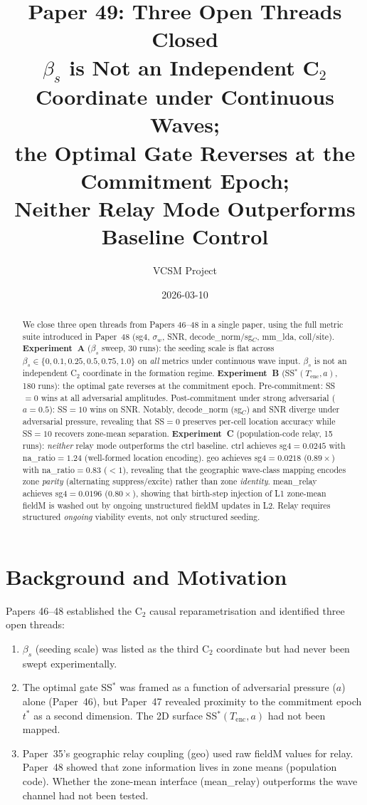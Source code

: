 \documentclass[11pt,a4paper]{article}
\title{\textbf{Paper 49: Three Open Threads Closed}\\
\large $\beta_s$ is Not an Independent C$_2$ Coordinate under Continuous Waves;\\
the Optimal Gate Reverses at the Commitment Epoch;\\
Neither Relay Mode Outperforms Baseline Control}
\author{VCSM Project}
\date{2026-03-10}
\begin{document}
\maketitle

\begin{abstract}
We close three open threads from Papers 46--48 in a single paper, using the full
metric suite introduced in Paper~48 (sg4, $\sigma_w$, SNR, decode\_norm/sg$_C$,
mm\_lda, coll/site).
\textbf{Experiment~A} ($\beta_s$ sweep, 30 runs): the seeding scale is flat across
$\beta_s \in \{0, 0.1, 0.25, 0.5, 0.75, 1.0\}$ on \emph{all} metrics under
continuous wave input.
$\beta_s$ is not an independent C$_2$ coordinate in the formation regime.
\textbf{Experiment~B} (SS$^*(T_\mathrm{enc}, a)$, 180 runs): the optimal gate
reverses at the commitment epoch.
Pre-commitment: SS$=0$ wins at all adversarial amplitudes.
Post-commitment under strong adversarial ($a=0.5$): SS$=10$ wins on SNR.
Notably, decode\_norm (sg$_C$) and SNR diverge under adversarial pressure,
revealing that SS$=0$ preserves per-cell location accuracy while SS$=10$ recovers
zone-mean separation.
\textbf{Experiment~C} (population-code relay, 15 runs): \emph{neither} relay mode
outperforms the ctrl baseline.
ctrl achieves sg4$=0.0245$ with na\_ratio$=1.24$ (well-formed location encoding).
geo achieves sg4$=0.0218$ ($0.89\times$) with na\_ratio$=0.83$ ($<1$),
revealing that the geographic wave-class mapping encodes zone
\emph{parity} (alternating suppress/excite) rather than zone \emph{identity}.
mean\_relay achieves sg4$=0.0196$ ($0.80\times$), showing that birth-step injection
of L1 zone-mean fieldM is washed out by ongoing unstructured fieldM updates in L2.
Relay requires structured \emph{ongoing} viability events, not only structured seeding.
\end{abstract}

\section{Background and Motivation}

Papers 46--48 established the C$_2$ causal reparametrisation and identified three
open threads:

\begin{enumerate}
  \item $\beta_s$ (seeding scale) was listed as the third C$_2$ coordinate but
        had never been swept experimentally.
  \item The optimal gate SS$^*$ was framed as a function of adversarial pressure
        ($a$) alone (Paper~46), but Paper~47 revealed proximity to the commitment
        epoch $t^*$ as a second dimension.
        The 2D surface SS$^*(T_\mathrm{enc}, a)$ had not been mapped.
  \item Paper~35's geographic relay coupling (geo) used raw fieldM values for relay.
        Paper~48 showed that zone information lives in zone means (population code).
        Whether the zone-mean interface (mean\_relay) outperforms the wave channel
        had not been tested.
\end{enumerate}
\end{document}
